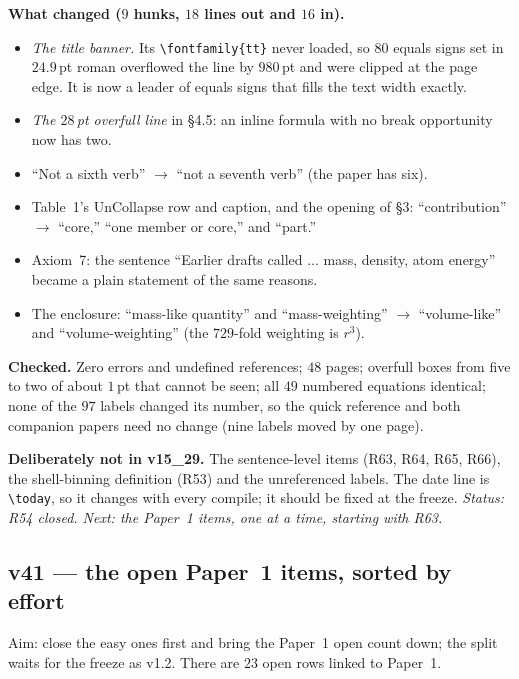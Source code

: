 \documentclass[11pt]{article}
\begin{document}
\textbf{What changed ($9$ hunks, $18$ lines out and $16$ in).}
\begin{itemize}
\item \emph{The title banner.} Its \texttt{\textbackslash fontfamily\{tt\}} never loaded, so $80$ equals signs set in
$24.9$\,pt roman overflowed the line by $980$\,pt and were clipped at the page edge. It is now a leader of equals signs that fills the text width exactly.
\item \emph{The $28$\,pt overfull line} in \S4.5: an inline formula with no break opportunity now has two.
\item ``Not a sixth verb'' $\to$ ``not a seventh verb'' (the paper has six).
\item Table~1's UnCollapse row and caption, and the opening of \S3: ``contribution'' $\to$ ``core,'' ``one member or core,'' and ``part.''
\item Axiom~7: the sentence ``Earlier drafts called $\ldots$ mass, density, atom energy'' became a plain statement of the same reasons.
\item The enclosure: ``mass-like quantity'' and ``mass-weighting'' $\to$ ``volume-like'' and ``volume-weighting'' (the $729$-fold weighting is $r^3$).
\end{itemize}

\textbf{Checked.} Zero errors and undefined references; $48$ pages; overfull boxes from five to two of about $1$\,pt that cannot be seen; all $49$ numbered
equations identical; none of the $97$ labels changed its number, so the quick reference and both companion papers need no change (nine labels moved by one page).

\textbf{Deliberately not in v15\_29.} The sentence-level items (R63, R64, R65, R66), the shell-binning definition (R53) and the unreferenced labels. The date line is
\texttt{\textbackslash today}, so it changes with every compile; it should be fixed at the freeze.
\emph{Status: R54 closed. Next: the Paper~1 items, one at a time, starting with R63.}


\subsection*{v41 --- the open Paper~1 items, sorted by effort}
Aim: close the easy ones first and bring the Paper~1 open count down; the split waits for the freeze as v1.2. There are $23$ open rows linked to Paper~1.
\end{document}
